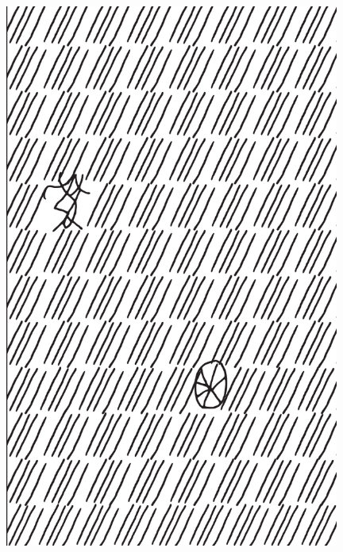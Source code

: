 \makeatletter\@openrightfalse
\movetooddpage
\begin{absolutelynopagebreak}
\begin{vplace}
\begin{figure}[H]
\begin{adjustwidth}{-0.99cm}{}
  \centering
  \vspace*{-1.77cm}
  \includegraphics[width=110mm]{./imgs/img4.pdf}  
  \hfill
\end{adjustwidth}

\thispagestyle{empty}

\end{figure}
\end{vplace}

\end{absolutelynopagebreak}

